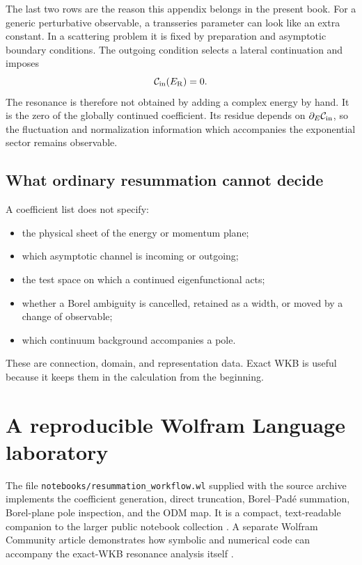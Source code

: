 The last two rows are the reason this appendix belongs in the present book.
For a generic perturbative observable, a transseries parameter can look like
an extra constant.  In a scattering problem it is fixed by preparation and
asymptotic boundary conditions.  The outgoing condition selects a lateral
continuation and imposes
\begin{equation}
  \mathcal{C}_{\mathrm{in}}(E_{\mathrm{R}})=0.
  \label{eq:appendix-resonance-condition}
\end{equation}
The resonance is therefore not obtained by adding a complex energy by hand.
It is the zero of the globally continued coefficient.  Its residue depends
on $\partial_E\mathcal{C}_{\mathrm{in}}$, so the fluctuation and normalization information
which accompanies the exponential sector remains observable.

\subsection{What ordinary resummation cannot decide}
\label{subsec:resummation-limit}

A coefficient list does not specify:
\begin{itemize}
  \item the physical sheet of the energy or momentum plane;
  \item which asymptotic channel is incoming or outgoing;
  \item the test space on which a continued eigenfunctional acts;
  \item whether a Borel ambiguity is cancelled, retained as a width, or
        moved by a change of observable;
  \item which continuum background accompanies a pole.
\end{itemize}
These are connection, domain, and representation data.  Exact WKB is useful
because it keeps them in the calculation from the beginning.

\section{A reproducible Wolfram Language laboratory}
\label{sec:wolfram-resummation-lab}

The file \texttt{notebooks/resummation\_workflow.wl} supplied with the source
archive implements the coefficient generation, direct truncation,
Borel--Pad\'e summation, Borel-plane pole inspection, and the ODM map.  It is
a compact, text-readable companion to the larger public notebook collection
\cite{Morikawa:ResummationRepository}.  A separate Wolfram Community article
demonstrates how symbolic and numerical code can accompany the exact-WKB
resonance analysis itself \cite{Morikawa:2026WolframCommunity}.

